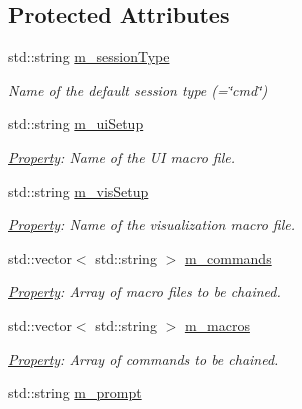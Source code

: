 \subsection*{Protected Attributes}
\begin{DoxyCompactItemize}
\item 
std\+::string \hyperlink{class_d_d4hep_1_1_simulation_1_1_geant4_u_i_manager_aeef8066abb2d31001194f741f423a8b3}{m\+\_\+session\+Type}
\begin{DoxyCompactList}\small\item\em Name of the default session type (=\char`\"{}cmd\char`\"{}) \end{DoxyCompactList}\item 
std\+::string \hyperlink{class_d_d4hep_1_1_simulation_1_1_geant4_u_i_manager_a9c86ca8f03b026e13ae71de58164b339}{m\+\_\+ui\+Setup}
\begin{DoxyCompactList}\small\item\em \hyperlink{class_d_d4hep_1_1_property}{Property}\+: Name of the UI macro file. \end{DoxyCompactList}\item 
std\+::string \hyperlink{class_d_d4hep_1_1_simulation_1_1_geant4_u_i_manager_aa1bdcdb2a02479af8627ea0ba6d12f69}{m\+\_\+vis\+Setup}
\begin{DoxyCompactList}\small\item\em \hyperlink{class_d_d4hep_1_1_property}{Property}\+: Name of the visualization macro file. \end{DoxyCompactList}\item 
std\+::vector$<$ std\+::string $>$ \hyperlink{class_d_d4hep_1_1_simulation_1_1_geant4_u_i_manager_a9c64c0675309cf8f76c23249e58cf3db}{m\+\_\+commands}
\begin{DoxyCompactList}\small\item\em \hyperlink{class_d_d4hep_1_1_property}{Property}\+: Array of macro files to be chained. \end{DoxyCompactList}\item 
std\+::vector$<$ std\+::string $>$ \hyperlink{class_d_d4hep_1_1_simulation_1_1_geant4_u_i_manager_a37b623b5b76a886a17a0ce68ce484188}{m\+\_\+macros}
\begin{DoxyCompactList}\small\item\em \hyperlink{class_d_d4hep_1_1_property}{Property}\+: Array of commands to be chained. \end{DoxyCompactList}\item 
std\+::string \hyperlink{class_d_d4hep_1_1_simulation_1_1_geant4_u_i_manager_a64fbd1b49cb4e68cb8af888c946c1f1d}{m\+\_\+prompt}

\end{DoxyCompactItemize}
